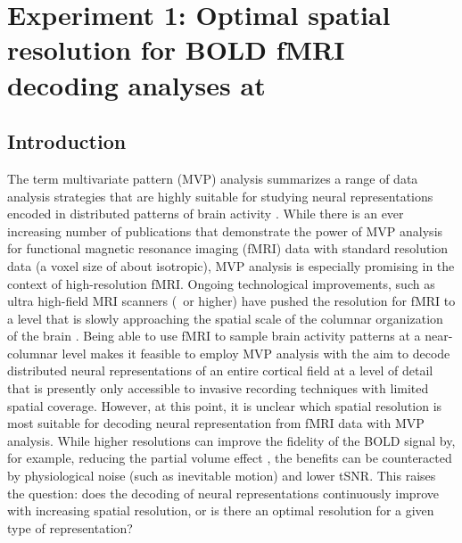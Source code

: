 \chapter{Experiment 1: Optimal spatial resolution for BOLD fMRI decoding analyses at \sevenT}


\section*{Introduction}

The term multivariate pattern (MVP) analysis summarizes a range of data
analysis strategies that are highly suitable for studying neural
representations encoded in distributed patterns of brain activity
\citep{haxby_2012}. While there is an ever increasing number of publications
that demonstrate the power of MVP analysis for functional magnetic resonance
imaging (fMRI) data \citep{opdebeeck_2010,freeman_2011,alink_2013,freeman_2013}
with standard resolution data (a voxel size of about  isotropic), MVP
analysis is especially promising in the context of high-resolution fMRI.
Ongoing technological improvements, such as ultra high-field MRI scanners
(\sevenT\ or higher) have pushed the resolution for fMRI to a level
that is slowly approaching the spatial scale of the columnar organization of
the brain \citep{yacoub_2008,heidemann_2012}. Being able to use fMRI to sample
brain activity patterns at a near-columnar level makes it feasible to employ
MVP analysis with the aim to decode distributed neural representations of an
entire cortical field at a level of detail that is presently only accessible to
invasive recording techniques with limited spatial coverage. However, at this
point, it is unclear which spatial resolution is most suitable for decoding
neural representation from fMRI data with MVP analysis. While higher
resolutions can improve the fidelity of the BOLD signal by, for example,
reducing the partial volume effect \citep{Weibull_2008}, the benefits can be
counteracted by physiological noise (such as inevitable motion) and lower tSNR. 
This raises the question: does the decoding of neural representations continuously improve
with increasing spatial resolution, or is there an optimal resolution for a
given type of representation?

